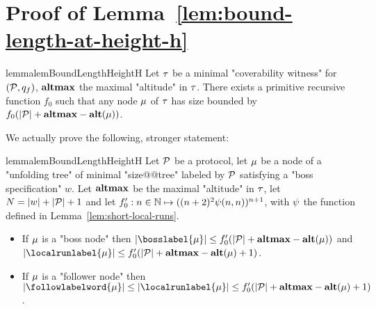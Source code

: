 \section{Proof of Lemma~\ref{lem:bound-length-at-height-h}}
\label{app:bound-node-size-with-altitude}

\begin{restatable}{lemma}{lemBoundLengthHeightH}
	\label{lem:bound-length-at-height-h}
	Let $\tau$ be a minimal "coverability witness" for $(\mathcal{P},q_f)$, $\mathbf{altmax}$ the maximal "altitude" in $\tau$. There exists a primitive recursive function $f_0$ such that any node $\mu$ of $\tau$ has size bounded by $f_0(|\mathcal{P}| + \mathbf{altmax} - \mathbf{alt}(\mu))$.
\end{restatable}

We actually prove the following, stronger statement:
\begin{restatable}{lemma}{lemBoundLengthHeightH}
	\label{lem:bound-length-at-height-h-extended}
	Let $\mathcal{P}$ be a protocol, let $\mu$ be a node of a "unfolding tree" of minimal "size@@tree" labeled by $\mathcal{P}$ satisfying a "boss specification" $w$.
	Let $\mathbf{altmax}$ be the maximal "altitude" in $\tau$, let $N = |w| + |\mathcal{P}| +1$ and let $f_0' : n \in \mathbb{N} \mapsto ((n+2)^2 \psi(n,n))^{n+1}$, with $\psi$ the function defined in Lemma~\ref{lem:short-local-runs}.
	
	\begin{itemize}
		\item If $\mu$ is a "boss node" then $\size{\bosslabel{\node}} \leq f_0'(\size{\prot} +\altmax - \altitude{\node})$ and $\size{\localrunlabel{\node}} \leq f_0'(\size{\prot} +\altmax - \altitude{\node}+1)$.
		
		\item If $\mu$ is a "follower node" then $\size{\followlabelword{\node}} \leq \size{\localrunlabel{\node}} \leq f_0'(\size{\prot} + \altmax - \altitude{\node}+1)$.
	\end{itemize} 
\end{restatable}
